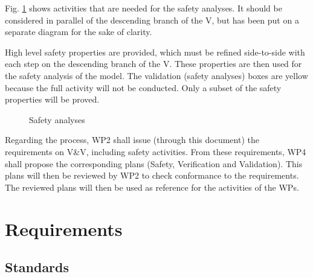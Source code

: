 \documentclass{template/openetcs_article}
\begin{document}
Fig. \ref{fig:safety_process} shows activities that are needed for the safety analyses. It should 
be considered in parallel of the descending branch of the V, but has been put on a separate diagram for
the sake of clarity.

High level safety properties are provided, which must be refined side-to-side with each step on the 
descending branch of the V. These properties are then used for the safety analysis of the model. The 
validation (safety analyses) boxes are yellow because the full activity will not be conducted. Only 
a subset of the safety properties will be proved.

\begin{figure}
  \centering
  \caption{Safety analyses}
  \label{fig:safety_process}
\end{figure}

Regarding the process, WP2 shall issue (through this document) the requirements on V\&V, including
safety activities. From these requirements, WP4 shall propose the corresponding plans (Safety,
Verification and Validation). This plans will then be reviewed by WP2 to check conformance to the 
requirements. The reviewed plans will then be used as reference for the activities of the WPs.


\section{Requirements}
\subsection{Standards}
\label{standards}

\end{document}
